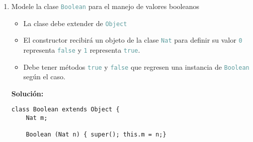 \documentclass{article}
\newcommand{\tp}[1]{\textcolor{CadetBlue} {\texttt{#1}}}
\newcommand{\tb}[1]{\textcolor{RoyalPurple} {\textbf{#1}}}
\begin{document}
\begin{enumerate}
\begin{enumerate}
\begin{verbatim}
}

// Clase del Cero definida en las notas
class Cero extends Nat {
    Cero (Object n) {super(n);}

    Nat pred() {return this;}

    Nat suma(Nat n) {return n;}

    Nat multi(Nat n) {return this;}

    /** calcular el caso base del método auxiliar 'flipPot'
    * @param Nat n número del que $this$ es exponente.
    * @return $n^0 = 1 = suc(0) = this.suc()$
    */
    Nat flipPot(Nat n) {return this.suc();}

    /** calcular el caso base del método auxiliar 'lt'
    * $0 < n \iff bool(n) = True$
    * @param Nat n número a comparar
    * @return $this < n$
    */
    Booelan lt(Nat n) {return new Boolean(n);}

    // método auxiliar para calcular 'not' en Boolean
    Nat inv() {return this.suc();}
}
        \end{verbatim}

        Donde \tp{not} está definido como

        \begin{verbatim}
class Boolean extends Object {
    ...
    Boolean not() {return new Boolean(this.m.inv());}
}
        \end{verbatim}

            \item Modele la clase \tp{Boolean} para el manejo de valores
            booleanos
            \begin{itemize}
                \item La clase debe extender de \tp{Object}

                \item El constructor recibirá un objeto de la clase \tp{Nat}
                para definir su valor \tp{0} representa \tp{false} y \tp{1}
                representa \tp{true}.

                \item Debe tener métodos \tp{true} y \tp{false} que regresen una
                instancia de \tp{Boolean} según el caso.
            \end{itemize}

            \tb{Solución:}
            \begin{verbatim}
class Boolean extends Object {
    Nat m;

    Boolean (Nat n) { super(); this.m = n;}


\end{verbatim}
\end{enumerate}
\end{enumerate}
\end{document}
